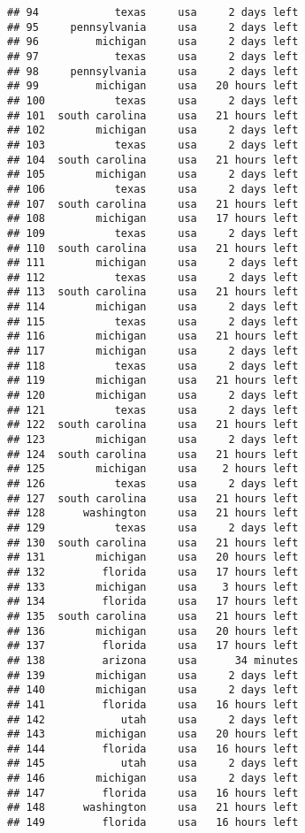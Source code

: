 \documentclass[
]{article}
\begin{document}
\begin{verbatim}
## 94            texas     usa     2 days left
## 95     pennsylvania     usa     2 days left
## 96         michigan     usa     2 days left
## 97            texas     usa     2 days left
## 98     pennsylvania     usa     2 days left
## 99         michigan     usa   20 hours left
## 100           texas     usa     2 days left
## 101  south carolina     usa   21 hours left
## 102        michigan     usa     2 days left
## 103           texas     usa     2 days left
## 104  south carolina     usa   21 hours left
## 105        michigan     usa     2 days left
## 106           texas     usa     2 days left
## 107  south carolina     usa   21 hours left
## 108        michigan     usa   17 hours left
## 109           texas     usa     2 days left
## 110  south carolina     usa   21 hours left
## 111        michigan     usa     2 days left
## 112           texas     usa     2 days left
## 113  south carolina     usa   21 hours left
## 114        michigan     usa     2 days left
## 115           texas     usa     2 days left
## 116        michigan     usa   21 hours left
## 117        michigan     usa     2 days left
## 118           texas     usa     2 days left
## 119        michigan     usa   21 hours left
## 120        michigan     usa     2 days left
## 121           texas     usa     2 days left
## 122  south carolina     usa   21 hours left
## 123        michigan     usa     2 days left
## 124  south carolina     usa   21 hours left
## 125        michigan     usa    2 hours left
## 126           texas     usa     2 days left
## 127  south carolina     usa   21 hours left
## 128      washington     usa   21 hours left
## 129           texas     usa     2 days left
## 130  south carolina     usa   21 hours left
## 131        michigan     usa   20 hours left
## 132         florida     usa   17 hours left
## 133        michigan     usa    3 hours left
## 134         florida     usa   17 hours left
## 135  south carolina     usa   21 hours left
## 136        michigan     usa   20 hours left
## 137         florida     usa   17 hours left
## 138         arizona     usa      34 minutes
## 139        michigan     usa     2 days left
## 140        michigan     usa     2 days left
## 141         florida     usa   16 hours left
## 142            utah     usa     2 days left
## 143        michigan     usa   20 hours left
## 144         florida     usa   16 hours left
## 145            utah     usa     2 days left
## 146        michigan     usa     2 days left
## 147         florida     usa   16 hours left
## 148      washington     usa   21 hours left
## 149         florida     usa   16 hours left

\end{verbatim}
\end{document}

